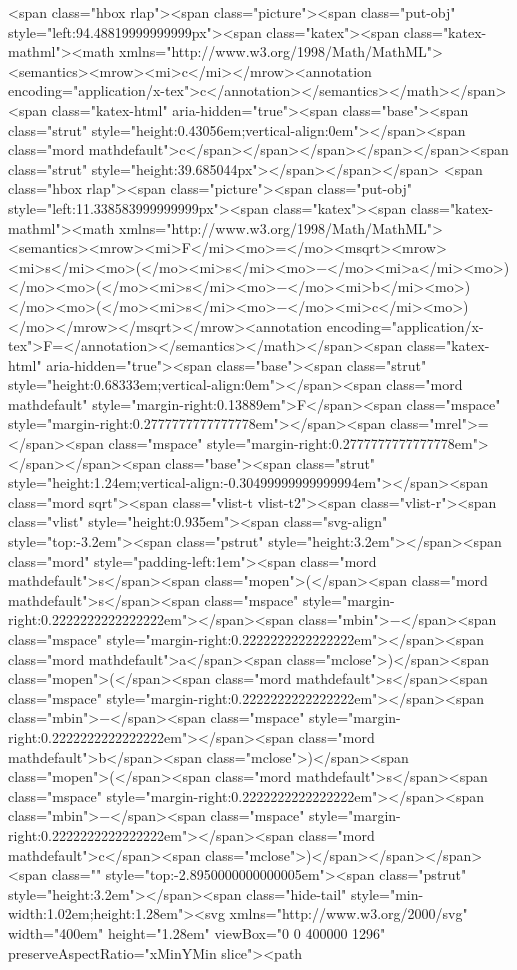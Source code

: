 <span class="hbox rlap"><span class="picture"><span class="put-obj" style="left:94.48819999999999px"><span class="katex"><span class="katex-mathml"><math xmlns="http://www.w3.org/1998/Math/MathML"><semantics><mrow><mi>c</mi></mrow><annotation encoding="application/x-tex">c</annotation></semantics></math></span><span class="katex-html" aria-hidden="true"><span class="base"><span class="strut" style="height:0.43056em;vertical-align:0em"></span><span class="mord mathdefault">c</span></span></span></span></span><span class="strut" style="height:39.685044px"></span></span></span>
<span class="hbox rlap"><span class="picture"><span class="put-obj" style="left:11.338583999999999px"><span class="katex"><span class="katex-mathml"><math xmlns="http://www.w3.org/1998/Math/MathML"><semantics><mrow><mi>F</mi><mo>=</mo><msqrt><mrow><mi>s</mi><mo>(</mo><mi>s</mi><mo>−</mo><mi>a</mi><mo>)</mo><mo>(</mo><mi>s</mi><mo>−</mo><mi>b</mi><mo>)</mo><mo>(</mo><mi>s</mi><mo>−</mo><mi>c</mi><mo>)</mo></mrow></msqrt></mrow><annotation encoding="application/x-tex">F=</annotation></semantics></math></span><span class="katex-html" aria-hidden="true"><span class="base"><span class="strut" style="height:0.68333em;vertical-align:0em"></span><span class="mord mathdefault" style="margin-right:0.13889em">F</span><span class="mspace" style="margin-right:0.2777777777777778em"></span><span class="mrel">=</span><span class="mspace" style="margin-right:0.2777777777777778em"></span></span><span class="base"><span class="strut" style="height:1.24em;vertical-align:-0.30499999999999994em"></span><span class="mord sqrt"><span class="vlist-t vlist-t2"><span class="vlist-r"><span class="vlist" style="height:0.935em"><span class="svg-align" style="top:-3.2em"><span class="pstrut" style="height:3.2em"></span><span class="mord" style="padding-left:1em"><span class="mord mathdefault">s</span><span class="mopen">(</span><span class="mord mathdefault">s</span><span class="mspace" style="margin-right:0.2222222222222222em"></span><span class="mbin">−</span><span class="mspace" style="margin-right:0.2222222222222222em"></span><span class="mord mathdefault">a</span><span class="mclose">)</span><span class="mopen">(</span><span class="mord mathdefault">s</span><span class="mspace" style="margin-right:0.2222222222222222em"></span><span class="mbin">−</span><span class="mspace" style="margin-right:0.2222222222222222em"></span><span class="mord mathdefault">b</span><span class="mclose">)</span><span class="mopen">(</span><span class="mord mathdefault">s</span><span class="mspace" style="margin-right:0.2222222222222222em"></span><span class="mbin">−</span><span class="mspace" style="margin-right:0.2222222222222222em"></span><span class="mord mathdefault">c</span><span class="mclose">)</span></span></span><span class="" style="top:-2.8950000000000005em"><span class="pstrut" style="height:3.2em"></span><span class="hide-tail" style="min-width:1.02em;height:1.28em"><svg xmlns="http://www.w3.org/2000/svg" width="400em" height="1.28em" viewBox="0 0 400000 1296" preserveAspectRatio="xMinYMin slice"><path 